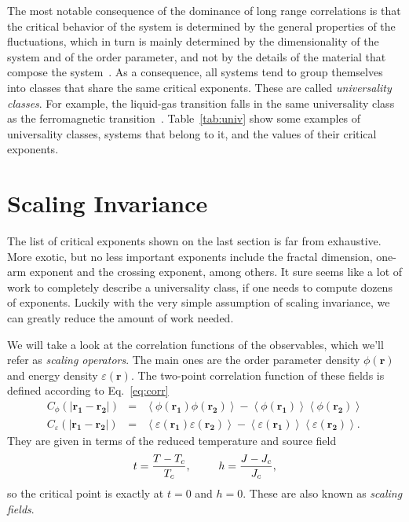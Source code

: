 The most notable consequence of the dominance of long range correlations is
that the critical behavior of the system is determined by the general
properties of the fluctuations, which in turn is mainly determined by the
dimensionality of the system and of the order parameter, and not by the details
of the material that compose the system~\cite{Stanley1999}. As a consequence,
all systems tend to group themselves into classes that share the same critical
exponents. These are called \textit{universality classes}. For example, the
liquid-gas transition falls in the same universality class as the ferromagnetic
transition~\cite{Kim1984}. Table~\ref{tab:univ} show some examples of
universality classes, systems that belong to it, and the values of their
critical exponents.




\section{Scaling Invariance}
\label{sec:scaling}
\renewcommand{\op}{\phi}

The list of critical exponents shown on the last section is far from
exhaustive. More exotic, but no less important exponents include the fractal
dimension, one-arm exponent and the crossing exponent, among others. It sure
seems like a lot of work to completely describe a universality class, if one
needs to compute dozens of exponents. Luckily with the very simple assumption
of scaling invariance, we can greatly reduce the amount of work needed.

We will take a look at the correlation functions of the observables, which
we'll refer as \textit{scaling operators}. The main ones are the order
parameter density $\op(\mathbf{r})$ and energy density
$\varepsilon(\mathbf{r})$. The two-point correlation function of these fields is
defined according to Eq.~\ref{eq:corr}
\begin{eqnarray}
    \label{eq:corr10}
    C_{\op}\left(\left|\mathbf{r_1}-\mathbf{r_2}\right|\right) & = &
    \left\langle
        \op\left(\mathbf{r_{1}}\right)
        \op\left(\mathbf{r_{2}}\right)
    \right\rangle -
    \left\langle
        \op\left(\mathbf{r_{1}}\right)
    \right\rangle
    \left\langle
        \op\left(\mathbf{r_{2}}\right)
    \right\rangle
    \\
    \label{eq:corr11}
    C_{\varepsilon}\left(\left|\mathbf{r_1}-\mathbf{r_2}\right|\right) & = &
    \left\langle
        \varepsilon\left(\mathbf{r_{1}}\right)
        \varepsilon\left(\mathbf{r_{2}}\right)
    \right\rangle-
    \left\langle
        \varepsilon\left(\mathbf{r_{1}}\right)
    \right\rangle
    \left\langle
        \varepsilon\left(\mathbf{r_{2}}\right)
    \right\rangle.
\end{eqnarray}
They are given in terms of the reduced temperature and source field
\begin{equation}
    t=\frac{T-T_c}{T_c},\;\;\;\;\;\;\;\;\;h=\frac{J-J_c}{J_c},
\end{equation}
so the critical point is exactly at $t=0$ and $h=0$. These are also known
as \textit{scaling fields}.

